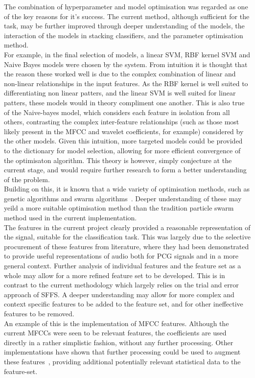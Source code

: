 \documentclass[titlepage, 12pt]{scrartcl} \usepackage{enumitem}
\begin{document}
The combination of hyperparameter and model optimisation was regarded as one of
the key reasons for it's success. The current method, although sufficient for
the task, may be further improved through deeper understanding of the models,
the interaction of the models in stacking classifiers, and the parameter
optimisation method.\\
For example, in the final selection of models, a linear SVM, RBF kernel SVM and
Naive Bayes models were chosen by the system. From intuition it is thought that
the reason these worked well is due to the complex combination of linear and
non-linear relationships in the input features. As the RBF kernel is well
suited to differentiating non linear patters, and the linear SVM is well suited
for linear patters, these models would in theory compliment one another. This
is also true of the Naive-bayes model, which considers each feature in
isolation from all others, contrasting the complex inter-feature relationships
(such as those most likely present in the MFCC and wavelet coefficients, for
example) considered by the other models. Given this intuition, more targeted
models could be provided to the dictionary for model selection, allowing for
more efficient convergence of the optimisaton algorithm. This theory is
however, simply conjecture at the current stage, and would require further
research to form a better understanding of the problem.\\
Building on this, it is known that a wide variety of optimisation methods, such
as genetic algorithms and swarm algorithms~\parencite[p.32]{Sesmero2015}.
Deeper understanding of these may yeild a more suitable optimisation method
than the tradition particle swarm method used in the current implementation.\\

The features in the current project clearly provided a reasonable
representation of the signal, suitable for the classification task. This was
largely due to the selective procurement of these features from literature,
where they had been demonstrated to provide useful representations of audio
both for PCG signals and in a more general context. Further analysis of
individual features and the feature set as a whole may allow for a more refined
feature set to be developed. This is in contrast to the current methodology
which largely relies on the trial and error approach of SFFS. A deeper
understanding may allow for more complex and context specific features to be
added to the feature set, and for other ineffective features to be removed.\\ An
example of this is the implementation of MFCC features. Although the current
MFCCs were seen to be relevant features, the coefficients are used directly in
a rather simplistic fashion, without any further processing. Other
implementations have shown that further processing could be used to augment
these features~\parencite{Zabihi2016}, providing additional potentially relevant
statistical data to the feature-set.\\
\end{document}
